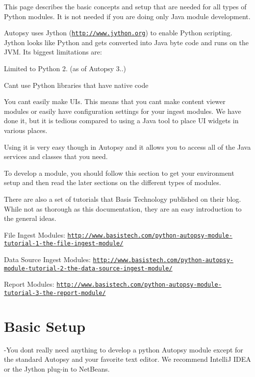 This page describes the basic concepts and setup that are needed for all types of Python modules. It is not needed if you are doing only Java module development.

Autopsy uses Jython (\href{http://www.jython.org}{\tt http\+://www.\+jython.\+org}) to enable Python scripting. Jython looks like Python and gets converted into Java byte code and runs on the J\+VM. Its biggest limitations are\+:
\begin{DoxyItemize}
\item Limited to Python 2. (as of Autopsy 3..)
\item Can\textquotesingle{}t use Python libraries that have native code
\item You can\textquotesingle{}t easily make U\+Is. This means that you can\textquotesingle{}t make content viewer modules or easily have configuration settings for your ingest modules. We have done it, but it is tedious compared to using a Java tool to place UI widgets in various places.
\end{DoxyItemize}

Using it is very easy though in Autopsy and it allows you to access all of the Java services and classes that you need.

To develop a module, you should follow this section to get your environment setup and then read the later sections on the different types of modules.

There are also a set of tutorials that Basis Technology published on their blog. While not as thorough as this documentation, they are an easy introduction to the general ideas.


\begin{DoxyItemize}
\item File Ingest Modules\+: \href{http://www.basistech.com/python-autopsy-module-tutorial-1-the-file-ingest-module/}{\tt http\+://www.\+basistech.\+com/python-\/autopsy-\/module-\/tutorial-\/1-\/the-\/file-\/ingest-\/module/}
\item Data Source Ingest Modules\+: \href{http://www.basistech.com/python-autopsy-module-tutorial-2-the-data-source-ingest-module/}{\tt http\+://www.\+basistech.\+com/python-\/autopsy-\/module-\/tutorial-\/2-\/the-\/data-\/source-\/ingest-\/module/}
\item Report Modules\+: \href{http://www.basistech.com/python-autopsy-module-tutorial-3-the-report-module/}{\tt http\+://www.\+basistech.\+com/python-\/autopsy-\/module-\/tutorial-\/3-\/the-\/report-\/module/}
\end{DoxyItemize}\hypertarget{mod_dev_py_page_mod_dev_py_setup}{}\section{Basic Setup}\label{mod_dev_py_page_mod_dev_py_setup}
-\/\+You don\textquotesingle{}t really need anything to develop a python Autopsy module except for the standard Autopsy and your favorite text editor. We recommend IntelliJ I\+D\+EA or the Jython plug-\/in to Net\+Beans.

